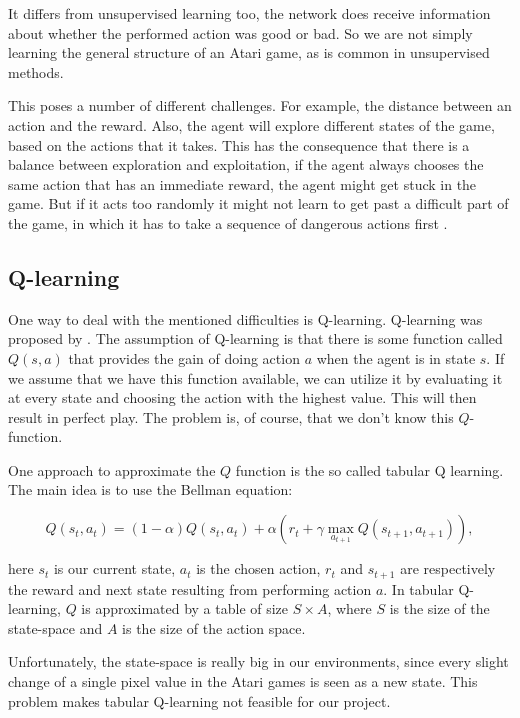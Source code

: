 \documentclass{article}
\begin{document}
It differs from unsupervised learning too, the network does receive information about whether the performed action was good or bad. So we are not simply learning the general structure of an Atari game, as is common in unsupervised methods.

This poses a number of different challenges. For example, the distance between an action and the reward. Also, the agent will explore different states of the game, based on the actions that it takes. This has the consequence that there is a balance between exploration and exploitation, if the agent always chooses the same action that has an immediate reward, the agent might get stuck in the game. But if it acts too randomly it might not learn to get past a difficult part of the game, in which it has to take a sequence of dangerous actions first \cite{reinforcementLearningDraft}.

\subsection{Q-learning}

One way to deal with the mentioned difficulties is Q-learning. Q-learning was proposed by \citeauthor{watkins1992q} \cite{watkins1992q}. The assumption of Q-learning is that there is some function called $Q(s, a)$ that provides the gain of doing action $a$ when the agent is in state $s$. If we assume that we have this function available, we can utilize it by evaluating it at every state and choosing the action with the highest value. This will then result in perfect play. The problem is, of course, that we don't know this $Q$-function. 

One approach to approximate the $Q$ function is the so called tabular Q learning. The main idea is to use the Bellman equation: 

\[
	Q(s_t,a_t) = (1 - \alpha) Q(s_t, a_t) + \alpha(r_t + \gamma \max_{a_{t+1}} Q(s_{t+1},a_{t+1})),
\]

here $s_t$ is our current state, $a_t$ is the chosen action, $r_t$ and $s_{t+1}$ are respectively the reward and next state resulting from performing action $a$. In tabular Q-learning, $Q$ is approximated by a table of size $S \times A$, where $S$ is the size of the state-space and $A$ is the size of the action space. 

Unfortunately, the state-space is really big in our environments, since every slight change of a single pixel value in the Atari games is seen as a new state. This problem makes tabular Q-learning not feasible for our project.
\end{document}

